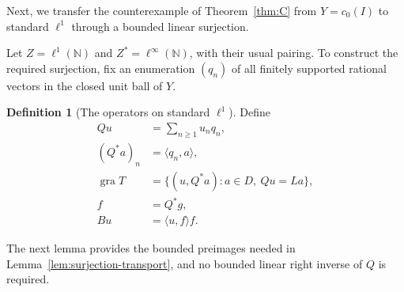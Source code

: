 \documentclass[11pt]{article}
\newcommand{\N}{\mathbb N}
\newcommand{\gra}{\operatorname{gra}}
\newcommand{\pair}[2]{\langle #1,#2\rangle}
\theoremstyle{definition}
\newtheorem{definition}{Definition}
\theoremstyle{remark}
\begin{document}
Next, we transfer the counterexample of Theorem~\ref{thm:C} from $Y=c_0(I)$ to standard $\ell^1$ through a bounded linear surjection.


Let $Z=\ell^1(\N)$ and $Z^*=\ell^\infty(\N)$, with their usual pairing. To construct the required surjection, fix an enumeration $(q_n)$ of all finitely supported rational vectors in the closed unit ball of $Y$.
\begin{definition}[The operators on standard $\ell^1$]
Define
\begin{equation}
\begin{aligned}
Qu&=\sum_{n\ge1}u_nq_n,\\
(Q^*a)_n&=\pair{q_n}{a},\\
\gra T&=\{(u,Q^*a):a\in D,\ Qu=La\},\\
f&=Q^*g,\\
Bu&=\pair{u}{f}f.
\end{aligned}
\label{eq:D10}
\end{equation}
\end{definition}
The next lemma provides the bounded preimages needed in Lemma~\ref{lem:surjection-transport}, and no bounded linear right inverse of $Q$ is required.
\end{document}

